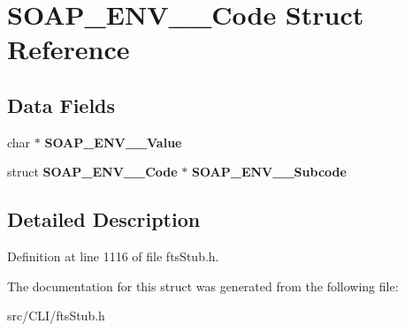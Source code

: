 \section{SOAP\_\-ENV\_\-\_\-Code Struct Reference}
\label{structSOAP__ENV____Code}
\subsection*{Data Fields}
\begin{DoxyCompactItemize}
\item 
char $\ast$ {\bfseries SOAP\_\-ENV\_\-\_\-Value}\label{structSOAP__ENV____Code_ad4f98507b4108e305613e7621f18949c}

\item 
struct {\bf SOAP\_\-ENV\_\-\_\-Code} $\ast$ {\bfseries SOAP\_\-ENV\_\-\_\-Subcode}\label{structSOAP__ENV____Code_a2d44ac860b79956cff26131fa68b4c5a}

\end{DoxyCompactItemize}


\subsection{Detailed Description}


Definition at line 1116 of file ftsStub.h.



The documentation for this struct was generated from the following file:\begin{DoxyCompactItemize}
\item 
src/CLI/ftsStub.h\end{DoxyCompactItemize}
